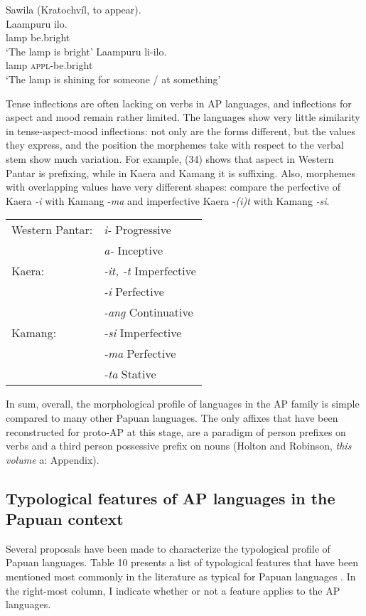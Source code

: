\ea%
\label{ex:33}
Sawila (Kratochv\'il, to appear).  \\
\ea
\gll Laampuru  ilo. \\
lamp  be.bright     \\
\glt `The lamp is bright'
\ex
\gll Laampuru  li-ilo.\\
  lamp \textsc{appl}{}-be.bright\\
\glt `The lamp is shining for someone / at something'
\z
\z



Tense inflections are often lacking on verbs in AP languages, and inflections for aspect and mood remain rather limited. The languages show very little similarity in tense-aspect-mood inflections: not only are the forms different, but the values they express, and the position the morphemes take with respect to the verbal stem show much variation. For example, (34) shows that aspect in Western Pantar is prefixing, while in Kaera and Kamang it is suffixing. Also, morphemes with overlapping values have very different shapes: compare the perfective of Kaera \textit{{}-i} with Kamang -\textit{ma} and imperfective Kaera -\textit{(i)t} with Kamang \textit{{}-si}.

\ea%
\label{ex:34}
\begin{tabular}{ll}
Western  Pantar: &   \textit{i-}  Progressive\\
& \textit{a-}  Inceptive\\
Kaera: &         \textit{{}-it, -t}  Imperfective\\
& \textit{{}-i}  Perfective\\
& \textit{{}-ang}  Continuative\\
Kamang: &      \textit{{}-si}  Imperfective \\
& \textit{{}-ma}  Perfective\\
& \textit{{}-ta}   Stative\\
\end{tabular}
\z

In sum, overall, the morphological profile of languages in the AP family is simple compared to many other Papuan languages. The only affixes that have been reconstructed for proto-AP at this stage, are a paradigm of person prefixes on verbs and a third person possessive prefix on nouns (Holton and Robinson, \textit{this volume} a: Appendix).

\subsection{Typological features of AP languages in the Papuan context}
Several proposals have been made to characterize the typological profile of Papuan languages. Table 10 presents a list of typological features that have been mentioned most commonly in the literature as typical for Papuan languages \citep[see]{Foley1986,Foley2000,Pawley2005,AikhenvaldEtAl2007, KlamerEtAl2008,KlamerEtAl2010}. In the right-most column, I indicate whether or not a feature applies to the AP languages.




